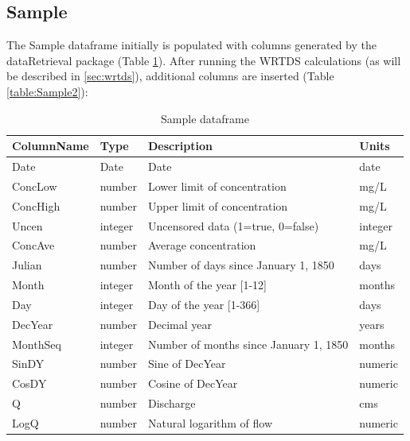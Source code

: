 \documentclass[a4paper,11pt]{article}
\begin{document}
\subsection{Sample}
\label{sec:dataframesSample}
The Sample dataframe initially is populated with columns generated by the dataRetrieval package (Table \ref{table:Sample1}). After running the WRTDS calculations (as will be described in \ref{sec:wrtds}), additional columns are inserted (Table \ref{table:Sample2}):

\begin{table}[!ht]
\begin{center}
\caption{Sample dataframe}
\label{table:Sample1}
\begin{tabular}{llll}
  \hline
ColumnName & Type & Description & Units \\ 
  \hline
Date & Date & Date & date \\ 
  ConcLow & number & Lower limit of concentration & mg/L \\ 
  ConcHigh & number & Upper limit of concentration & mg/L \\ 
  Uncen & integer & Uncensored data (1=true, 0=false) & integer \\ 
  ConcAve & number & Average concentration & mg/L \\ 
  Julian & number & Number of days since January 1, 1850 & days \\ 
  Month & integer & Month of the year [1-12] & months \\ 
  Day & integer & Day of the year [1-366] & days \\ 
  DecYear & number & Decimal year & years \\ 
  MonthSeq & integer & Number of months since January 1, 1850 & months \\ 
  SinDY & number & Sine of DecYear & numeric \\ 
  CosDY & number & Cosine of DecYear & numeric \\ 
  Q \footnotemark[1] & number & Discharge & cms \\ 
  LogQ \footnotemark[1] & number & Natural logarithm of flow & numeric \\ 
   \hline
\end{tabular}
\end{center}
\end{table}
\end{document}
